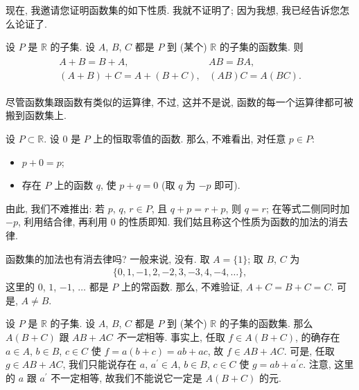 现在, 我邀请您证明函数集的如下性质.
我就不证明了;
因为我想, 我已经告诉您怎么论证了.

\begin{theorem}
    设 $P$ 是 $\mathbb{R}$ 的子集.
    设 $A$, $B$, $C$ 都是 $P$ 到
    (某个) $\mathbb{R}$ 的子集的函数集.
    则
    \begin{align*}
        \begin{array}{ll}
            A + B = B + A,             & AB = BA,       \\
            (A + B) + C = A + (B + C), & (AB)C = A(BC).
        \end{array}
    \end{align*}
\end{theorem}

尽管函数集跟函数有类似的运算律,
不过, 这并不是说,
函数的每一个运算律都可被搬到函数集上.

\begin{example}
    设 $P \subset \mathbb{R}$.
    设 $0$ 是 $P$ 上的恒取零值的函数.
    那么, 不难看出, 对任意 $p \in P$:
    \begin{itemize}
        \item $p + 0 = p$;
        \item 存在 $P$ 上的函数 $q$, 使 $p + q = 0$
              (取 $q$ 为 $-p$ 即可).
    \end{itemize}
    由此, 我们不难推出:
    若 $p$, $q$, $r \in P$, 且 $q + p = r + p$, 则 $q = r$;
    在等式二侧同时加 $-p$, 利用结合律, 再利用 $0$ 的性质即知.
    我们姑且称这个性质为函数的加法的消去律.

    函数集的加法也有消去律吗?
    一般来说, 没有.
    取 $A = \{ 1 \}$;
    取 $B$, $C$ 为
    \begin{align*}
        \{ 0, 1, -1, 2, -2, 3, -3, 4, -4, \dots \},
    \end{align*}
    这里的 $0$, $1$, $-1$, $\dots$ 都是 $P$ 上的常函数.
    那么, 不难验证, $A + C = B + C = C$.
    可是, $A \neq B$.
\end{example}

\begin{example}
    设 $P$ 是 $\mathbb{R}$ 的子集.
    设 $A$, $B$, $C$ 都是 $P$ 到
    (某个) $\mathbb{R}$ 的子集的函数集.
    那么 $A(B + C)$ 跟 $AB + AC$ \emph{不一定}相等.
    事实上, 任取 $f \in A(B + C)$,
    的确存在 $a \in A$, $b \in B$, $c \in C$
    使 $f = a(b + c) = ab + ac$,
    故 $f \in AB + AC$.
    可是, 任取 $g \in AB + AC$,
    我们只能说存在
    $a$, $a^{\prime} \in A$, $b \in B$, $c \in C$
    使 $g = ab + a^{\prime}c$.
    注意, 这里的 $a$ 跟 $a^{\prime}$ 不一定相等,
    故我们不能说它一定是 $A(B + C)$ 的元.
\end{example}

